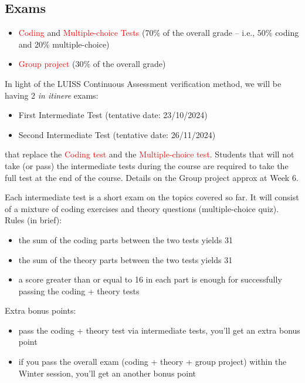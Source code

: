 \documentclass[t,handout,9pt]{beamer}
\begin{document}
\subsection{Exams}
\begin{frame}
\vfill
\begin{itemize}
	\item \textcolor{red}{Coding} and \textcolor{red}{Multiple-choice Tests} (70\% of the overall grade -- i.e., 50\% coding and 20\% multiple-choice)
	\item \textcolor{red}{Group project} (30\% of the overall grade)
\end{itemize}
\vfill
In light of the LUISS Continuous Assessment verification method,  we will be having 2 \textit{in itinere} exams:
\begin{itemize}
	\item First Intermediate Test (tentative date: 23/10/2024)
	\item Second Intermediate Test (tentative date: 26/11/2024)
\end{itemize}
that replace the \textcolor{red}{Coding test} and the \textcolor{red}{Multiple-choice test}.
\vfill
Students that will not take (or pass) the intermediate tests during the course are required to take the full test at the end of the course.
\vfill
Details on the Group project approx at Week 6.
\vfill
\end{frame}
%
\begin{frame}
\vfill
Each intermediate test is a short exam on the topics covered so far.
\vfill
It will consist of a mixture of coding exercises and theory questions (multiple-choice quiz).
\vfill
Rules (in brief):
\begin{itemize}
	\item the sum of the coding parts between the two tests yields 31
	\item the sum of the theory parts between the two tests yields 31
	\item a score greater than or equal to 16 in each part is enough for successfully passing the coding + theory tests
\end{itemize}
\vfill
Extra bonus points:
\begin{itemize}
	\item pass the coding + theory test via intermediate tests, you'll get an extra bonus point
	\item if you pass the overall exam (coding + theory + group project) within the Winter session, you'll get an another bonus point
\end{itemize}
\vfill
\end{frame}
\end{document}
